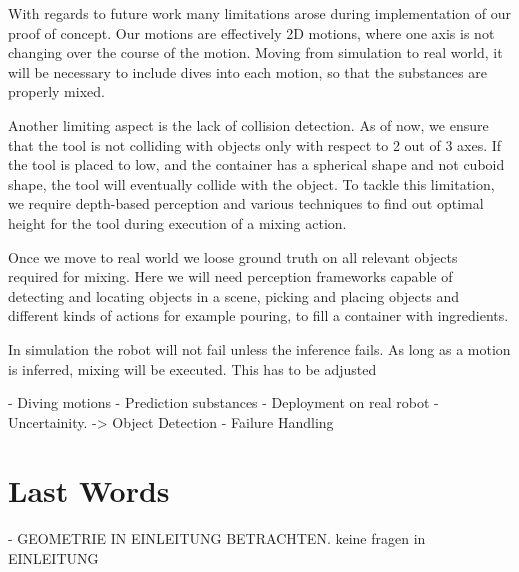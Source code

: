 With regards to future work many limitations arose during implementation of our proof of concept.
Our motions are effectively 2D motions, where one axis is not changing over the course of the motion.
Moving from simulation to real world, it will be necessary to include dives into each motion, so that 
the substances are properly mixed. 

Another limiting aspect is the lack of collision detection. As of now, we ensure that the tool is not colliding 
with objects only with respect to 2 out of 3 axes. If the tool is placed to low, and the container has a spherical shape and not 
cuboid shape, the tool will eventually collide with the object. To tackle this limitation, we require depth-based perception
and various techniques to find out optimal height for the tool during execution of a mixing action.

Once we move to real world we loose ground truth on all relevant objects required for mixing.
Here we will need perception frameworks capable of detecting and locating objects in a scene, 
picking and placing objects and different kinds of actions for example pouring, to fill a container
with ingredients.

In simulation the robot will not fail unless the inference fails. As long as a motion is inferred, mixing will be executed.
This has to be adjusted



- Diving motions
- Prediction substances
- Deployment on real robot
- Uncertainity. -> Object Detection
- Failure Handling

\section{Last Words}

- GEOMETRIE IN EINLEITUNG BETRACHTEN.
keine fragen in EINLEITUNG